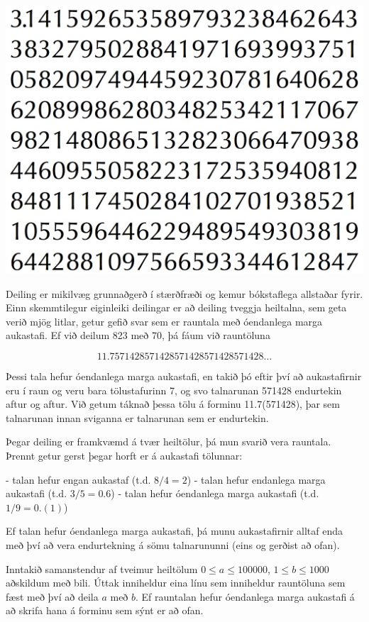 
\includegraphics[scale=0.4]{pi.jpg}

Deiling er mikilvæg grunnaðgerð í stærðfræði og kemur bókstaflega allstaðar
fyrir. Einn skemmtilegur eiginleiki deilingar er að deiling tveggja heiltalna,
sem geta verið mjög litlar, getur gefið svar sem er rauntala með óendanlega
marga aukastafi. Ef við deilum 823 með 70, þá fáum við rauntöluna

$$11.7571428571428571428571428571428\ldots$$

Þessi tala hefur óendanlega marga aukastafi, en takið þó eftir því að aukastafirnir
eru í raun og veru bara tölustafurinn 7, og svo talnarunan 571428 endurtekin
aftur og aftur. Við getum táknað þessa tölu á forminu 11.7(571428), þar sem
talnarunan innan sviganna er talnarunan sem er endurtekin.

Þegar deiling er framkvæmd á tvær heiltölur, þá mun svarið vera rauntala.
Þrennt getur gerst þegar horft er á aukastafi tölunnar:

- talan hefur engan aukastaf (t.d. $8/4 = 2$)
- talan hefur endanlega marga aukastafi (t.d. $3/5 = 0.6$)
- talan hefur óendanlega marga aukastafi (t.d. $1/9 = 0.(1)$)

Ef talan hefur óendanlega marga aukastafi, þá munu aukastafirnir alltaf enda
með því að vera endurtekning á sömu talnarununni (eins og gerðist að ofan).

Inntakið samanstendur af tveimur heiltölum $0 \leq a \leq 100000$, $1 \leq b \leq 1000$ aðskildum með bili. Úttak
inniheldur eina línu sem inniheldur rauntöluna sem fæst með því að deila $a$ með
$b$. Ef rauntalan hefur óendanlega marga aukastafi á að skrifa hana á forminu sem
sýnt er að ofan.
